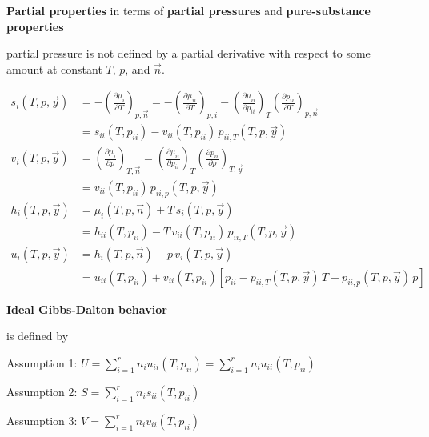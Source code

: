 \begin{defn}
    \textbf{Partial properties} in terms of \textbf{partial pressures} and \textbf{pure-substance properties}
    \begin{zhu}
        partial pressure is not defined by a partial derivative 
        with respect to some amount at constant \(T\), \(p\), and \(\vec{n}\).
    \end{zhu}
    \begin{align*}
        s_i(T, p, \vec{y}) &= - \left( \frac{\partial \mu_i}{\partial T} \right)_{p, \vec{n}} 
        = - \left( \frac{\partial \mu_{ii}}{\partial T} \right)_{p, i} 
        - \left( \frac{\partial \mu_{ii}}{\partial p_{ii}} \right)_T 
        \left( \frac{\partial p_{ii}}{\partial T} \right)_{p, \vec{n}} \\
        &= s_{ii}(T, p_{ii}) - v_{ii}(T, p_{ii}) \, p_{ii,T}(T, p, \vec{y}) 
    \\
        v_i(T, p, \vec{y}) &= \left( \frac{\partial \mu_i}{\partial p} \right)_{T, \vec{n}} 
        = \left( \frac{\partial \mu_{ii}}{\partial p_{ii}} \right)_T
        \left( \frac{\partial p_{ii}}{\partial p} \right)_{T, \vec{y}} \\
        &= v_{ii}(T, p_{ii}) \, p_{ii,p}(T, p, \vec{y})
    \\
        h_i(T, p, \vec{y}) &= \mu_i(T, p, \vec{n}) + T \, s_i(T, p, \vec{y}) \\
        &= h_{ii}(T, p_{ii}) - T \, v_{ii}(T, p_{ii}) \, p_{ii,T}(T, p, \vec{y})
    \\
        u_i(T, p, \vec{y}) &= h_i(T, p, \vec{n}) - p \, v_i(T, p, \vec{y}) \\
        &= u_{ii}(T, p_{ii}) + v_{ii}(T, p_{ii}) 
        \left[ p_{ii} - p_{ii,T}(T, p, \vec{y}) \, T - p_{ii,p}(T, p, \vec{y}) \, p \right]
    \end{align*}
\end{defn}
\begin{example}
    \textbf{Ideal Gibbs-Dalton behavior} 
    
    is defined by

Assumption 1: \(\displaystyle U = \sum_{i=1}^r n_i u_{ii}(T, p_{ii}) 
=\sum_{i=1}^{r}n_iu_{ii}(T,p_{ii}) \)

Assumption 2: \(\displaystyle S = \sum_{i=1}^r n_i s_{ii}(T, p_{ii}) \)

Assumption 3: \(\displaystyle V = \sum_{i=1}^r n_i v_{ii}(T, p_{ii}) \)
\end{example}













\ifx\allfiles\undefined

\fi
